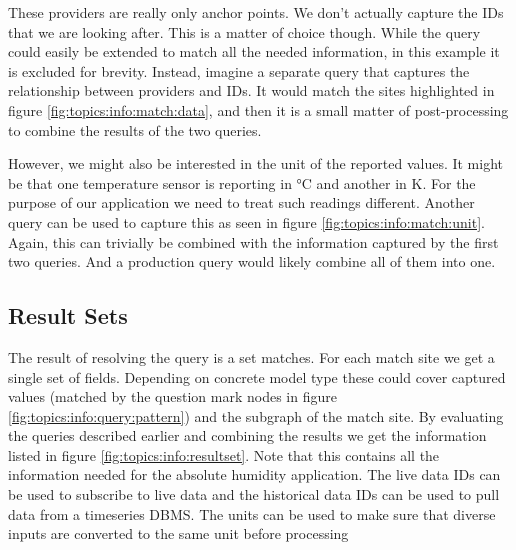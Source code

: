 These providers are really only anchor points. We don't actually capture the IDs that we are looking after. This is a matter of choice though. While the query could easily be extended to match all the needed information, in this example it is excluded for brevity. Instead, imagine a separate query that captures the relationship between providers and IDs. It would match the sites highlighted in figure \ref{fig:topics:info:match:data}, and then it is a small matter of post-processing to combine the results of the two queries.

However, we might also be interested in the unit of the reported values. It might be that one temperature sensor is reporting in \si{\degreeCelsius} and another in \si{\kelvin}. For the purpose of our application we need to treat such readings different. Another query can be used to capture this as seen in figure \ref{fig:topics:info:match:unit}. Again, this can trivially be combined with the information captured by the first two queries. And a production query would likely combine all of them into one.

\subsection{Result Sets}

The result of resolving the query is a set matches. For each match site we get a single set of fields. Depending on concrete model type these could cover captured values (matched by the question mark nodes in figure \ref{fig:topics:info:query:pattern}) and the subgraph of the match site. By evaluating the queries described earlier and combining the results we get the information listed in figure \ref{fig:topics:info:resultset}. Note that this contains all the information needed for the absolute humidity application. The live data IDs can be used to subscribe to live data and the historical data IDs can be used to pull data from a timeseries DBMS. The units can be used to make sure that diverse inputs are converted to the same unit before processing

